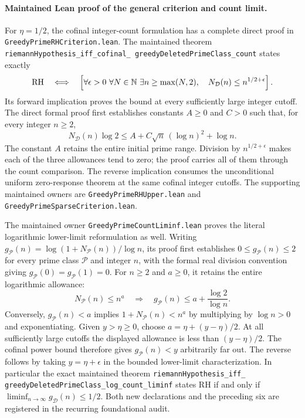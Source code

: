 \documentclass[11pt]{article}
\theoremstyle{definition}
\begin{document}
\paragraph{Maintained Lean proof of the general criterion and count limit.}
For $\eta=1/2$, the cofinal integer-count formulation has a complete
direct proof in \texttt{GreedyPrimeRHCriterion.lean}.
The maintained theorem
\texttt{riemannHypothesis\_\allowbreak iff\_\allowbreak cofinal\_\allowbreak
greedyDeletedPrimeClass\_\allowbreak count} states exactly
\[
 {\rm RH}\quad\Longleftrightarrow\quad
 \left[\forall\epsilon>0\ \forall N\in\mathbb N\
 \exists n\ge\max(N,2),\quad
 N_{\mathcal D}(n)\le n^{1/2+\epsilon}\right].
\]
Its forward implication proves the bound at every sufficiently large
integer cutoff.  The direct formal proof first establishes constants
$A\ge0$ and $C>0$ such that, for every integer $n\ge2$,
\[
 N_{\mathcal D}(n)\log2
 \le A+C\sqrt n\,(\log n)^2+\log n .
\]
The constant $A$ retains the entire initial prime range.
Division by $n^{1/2+\epsilon}$ makes each of the three allowances
tend to zero; the proof carries all of them through the count comparison.
The reverse implication consumes the unconditional uniform zero-response
theorem at the same cofinal integer cutoffs.
The supporting maintained owners are
\texttt{GreedyPrimeRHUpper.lean} and
\texttt{GreedyPrimeSparseCriterion.lean}.

The maintained owner \texttt{GreedyPrimeCountLiminf.lean} proves the
literal logarithmic lower-limit reformulation as well.
Writing $g_{\mathcal P}(n)=\log(1+N_{\mathcal P}(n))/\log n$,
its proof first establishes $0\le g_{\mathcal P}(n)\le2$ for every
prime class $\mathcal P$ and integer $n$, with the formal real division
convention giving $g_{\mathcal P}(0)=g_{\mathcal P}(1)=0$.
For $n\ge2$ and $a\ge0$, it retains the entire logarithmic allowance:
\[
 N_{\mathcal P}(n)\le n^a
 \quad\Longrightarrow\quad
 g_{\mathcal P}(n)\le a+\frac{\log2}{\log n}.
\]
Conversely, $g_{\mathcal P}(n)<a$ implies
$1+N_{\mathcal P}(n)<n^a$ by multiplying by $\log n>0$
and exponentiating.
Given $y>\eta\ge0$, choose $a=\eta+(y-\eta)/2$.
At all sufficiently large cutoffs the displayed allowance is less
than $(y-\eta)/2$.
The cofinal power bound therefore gives $g_{\mathcal P}(n)<y$
arbitrarily far out.
The reverse follows by taking $y=\eta+\epsilon$ in the
bounded lower-limit characterization.
In particular the exact maintained theorem
\texttt{riemannHypothesis\_\allowbreak iff\_\allowbreak
greedyDeletedPrimeClass\_\allowbreak log\_\allowbreak count\_\allowbreak liminf}
states RH if and only if
$\liminf_{n\to\infty}g_{\mathcal D}(n)\le1/2$.
Both new declarations and the preceding six are registered in the
recurring foundational audit.
\end{document}
